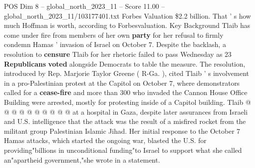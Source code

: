 \begin{textsample}{POS Dim 8 – global\_north\_2023\_11 – Score 11.00 – global\_north\_2023\_11/103177401.txt}
Forbes Valuation \$2.2 billion.
That ' s how much Hoffman is worth, according to Forbesvaluation.
Key Background Tlaib has come under fire from members of her own \textbf{party} for her refusal to firmly condemn Hamas ' invasion of Israel on October 7.
Despite the backlash, a resolution to \textbf{censure} Tlaib for her rhetoric failed to pass Wednesday as 23 \textbf{Republicans} \textbf{voted} alongside Democrats to table the measure.
The resolution, introduced by Rep.
Marjorie Taylor Greene ( R-Ga. ), cited Tlaib ' s involvement in a pro-Palestinian protest at the Capitol on October 7, where demonstrators called for a \textbf{cease-fire} and more than 300 who invaded the Cannon House Office Building were arrested, mostly for protesting inside of a Capitol building.
Tlaib @ @ @ @ @ @ @ @ @ @ at a hospital in Gaza, despite later assurances from Israeli and U.S. intelligence that the attack was the result of a misfired rocket from the militant group Palestinian Islamic Jihad.
Her initial response to the October 7 Hamas attacks, which started the ongoing war, blasted the U.S. for providing"billions in unconditional funding"to Israel to support what she called an"apartheid government,"she wrote in a statement.

\end{textsample}
